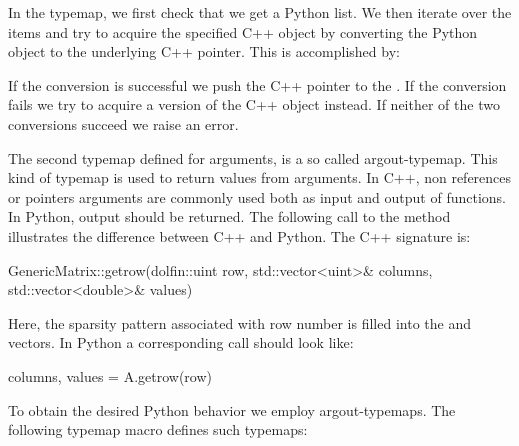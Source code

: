 In the typemap, we first check that we get a Python list. We then iterate
over the items and try to acquire the specified C++ object by converting
the Python object to the underlying C++ pointer. This is accomplished by:
If the conversion is successful we push the C++ pointer to the . If the conversion fails we try to acquire a  version of the C++ object instead. If neither of the two conversions succeed we raise an error.

The second typemap defined for  arguments, is a so called
argout-typemap. This kind of typemap is used to return values from
arguments. In C++, non  references or pointers arguments are
commonly used both as input and output of functions. In Python, output
should be returned. 
The following call to the  method   illustrates
the difference between C++ and Python. The C++ signature is:
\begin{swigcode}
GenericMatrix::getrow(dolfin::uint row, std::vector<uint>& columns, std::vector<double>& values)
\end{swigcode}
Here, the sparsity pattern associated with row number  is filled
into the  and  vectors. 
In Python a corresponding call should look like:
\begin{python}
columns, values = A.getrow(row)
\end{python}
To obtain the desired Python behavior we employ 
argout-typemaps. The following typemap macro defines such typemaps:   

